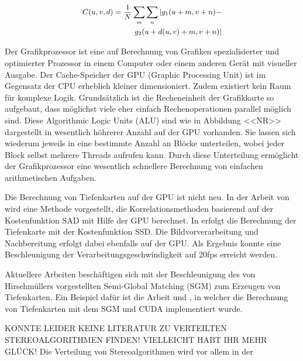 \documentclass[times, 10pt,twocolumn]{article}
\begin{document}
\begin{align}
\small 
\begin{split}
C(u,v,d) = \frac{1}{N}\sum\limits_{m} \sum\limits_{n} | g_1(u+m,v+n) - \\ g_2(u+d(u,v)+m,v+n)|
\label{eq:sad}
\end{split}
\end{align}

Der Grafikprozessor ist eine auf Berechnung von Grafiken spezialisierter und optimierter Prozessor in einem Computer oder einem anderen Gerät mit visueller Ausgabe.
Der Cache-Speicher der GPU (Graphic Processing Unit) ist im Gegensatz der CPU erheblich kleiner dimensioniert. Zudem existiert kein Raum für komplexe Logik. Grundsätzlich ist die Recheneinheit der Grafikkarte so aufgebaut, dass möglichst viele eher einfach Rechenoperationen parallel möglich sind.
Diese Algorithmic Logic Units (ALU) sind wie in Abbildung <<NR>> dargestellt in wesentlich höhrerer Anzahl auf der GPU vorhanden. Sie lassen sich wiederum jeweils in eine bestimmte Anzahl an Blöcke unterteilen, wobei jeder Block selbst mehrere Threads aufrufen kann. Durch diese Unterteilung ermöglicht der Grafikprozessor eine wesentlich schnellere Berechnung von einfachen arithmetischen Aufgaben.


Die Berechnung von Tiefenkarten auf der GPU ist nicht neu. In der Arbeit von \cite{Yang.2002} wird eine Methode vorgestellt, die Korrelationsmethoden basierend auf der Kostenfunktion SAD mit Hilfe der GPU berechnet. In \cite{Woetzel.2004} erfolgt die Berechnung der Tiefenkarte mit der Kostenfunktion SSD. Die Bildvorverarbeitung und Nachbereitung erfolgt dabei ebenfalls auf der GPU. Als Ergebnis konnte eine Beschleunigung der Verarbeitungsgeschwindigkeit auf 20fps erreicht werden.

Aktuellere Arbeiten beschäftigen sich mit der Beschleunigung des von Hirschmüllers vorgestellten Semi-Global Matching (SGM) \cite{Hirschmuller.2005} zum Erzeugen von Tiefenkarten. Ein Beispiel dafür ist die Arbeit \cite{Hirschmueller.2008} und \cite{Rosenberg.2006}, in welcher die Berechnung von Tiefenkarten mit dem SGM und CUDA implementiert wurde.

{\color{red}KONNTE LEIDER KEINE LITERATUR ZU VERTEILTEN STEREOALGORITHMEN FINDEN! VIELLEICHT HABT IHR MEHR GLÜCK!
Die Verteilung von Stereoalgorithmen wird vor allem in der}
\end{document}
